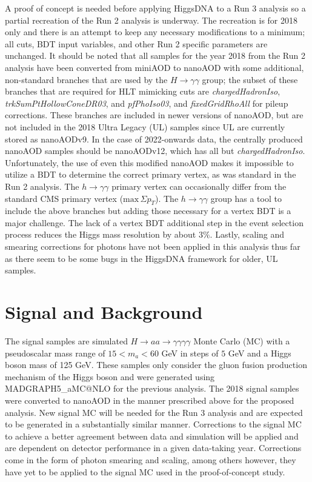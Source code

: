 \documentclass[12pt]{article}
\begin{document}
A proof of concept is needed before applying HiggsDNA to a Run 3 analysis so a partial recreation of the Run 2 analysis is underway. The recreation is for 2018 only and there is an attempt to keep any necessary modifications to a minimum; all cuts, BDT input variables, and other Run 2 specific parameters are unchanged. It should be noted that all samples for the year 2018 from the Run 2 analysis have been converted from miniAOD to nanoAOD with some additional, non-standard branches that are used by the $H \rightarrow \gamma\gamma$ group; the subset of these branches that are required for HLT mimicking cuts are \textit{chargedHadronIso}, \textit{trkSumPtHollowConeDR03}, and \textit{pfPhoIso03}, and \textit{fixedGridRhoAll} for pileup corrections. These branches are included in newer versions of nanoAOD, but are not included in the 2018 Ultra Legacy (UL) samples since UL are currently stored as nanoAODv9. In the case of 2022-onwards data, the centrally produced nanoAOD samples should be nanoAODv12, which has all but \textit{chargedHadronIso}. Unfortunately, the use of even this modified nanoAOD makes it impossible to utilize a BDT to determine the correct primary vertex, as was standard in the Run 2 analysis. The $h\rightarrow \gamma\gamma$ primary vertex can occasionally differ from the standard CMS primary vertex ($\mathrm{max}\,\Sigma p_T$). The $h\rightarrow \gamma\gamma$ group has a tool to include the above branches but adding those necessary for a vertex BDT is a major challenge. The lack of a vertex BDT additional step in the event selection process reduces the Higgs mass resolution by about $3\%$. Lastly, scaling and smearing corrections for photons have not been applied in this analysis thus far as there seem to be some bugs in the HiggsDNA framework for older, UL samples.\par

\section{Signal and Background}
The signal samples are simulated $H \rightarrow aa \rightarrow \gamma\gamma\gamma\gamma$ Monte Carlo (MC) with a pseudoscalar mass range of $15 < m_a < 60$ GeV in steps of $5$ GeV and a Higgs boson mass of 125 GeV. These samples only consider the gluon fusion production mechanism of the Higgs boson and were generated using MADGRAPH5\_aMC@NLO for the previous analysis. The 2018 signal samples were converted to nanoAOD in the manner prescribed above for the proposed analysis. New signal MC will be needed for the Run 3 analysis and are expected to be generated in a substantially similar manner. Corrections to the signal MC to achieve a better agreement between data and simulation will be applied and are dependent on detector performance in a given data-taking year. Corrections come in the form of photon smearing and scaling, among others however, they have yet to be applied to the signal MC used in the proof-of-concept study.\par
\end{document}
